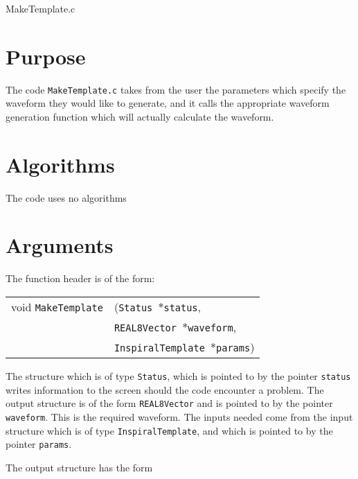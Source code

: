 \documentclass[12pt]{article}
\begin{document}
\huge
\begin{center}
MakeTemplate.c
\end{center}
\normalsize
\vspace{10mm}

\section{Purpose}

The code \texttt{MakeTemplate.c} takes from the user the parameters which specify the waveform they would like to generate, and it calls the appropriate waveform generation function which will actually calculate the waveform.


\section{Algorithms}

The code uses no algorithms


\section{Arguments}

The function header is of the form:

\vspace{5mm}

\begin{tabular}{ll}
void \texttt{MakeTemplate}&(\texttt{Status $\ast$status},     \\
                                   &\texttt{REAL8Vector $\ast$waveform}, \\
                                   &\texttt{InspiralTemplate $\ast$params})
\end{tabular}

\vspace{5mm}

The structure which is of type \texttt{Status}, which is pointed to by the pointer \texttt{status} writes information to the screen should the code encounter
a problem. The output structure is of the form \texttt{REAL8Vector} and is pointed to by the pointer \texttt{waveform}. This is the required waveform.
The inputs needed come from the input structure which is of type \texttt{InspiralTemplate}, and which is pointed to by the pointer \texttt{params}.

The output structure has the form

\vspace{5mm}
\end{document}
